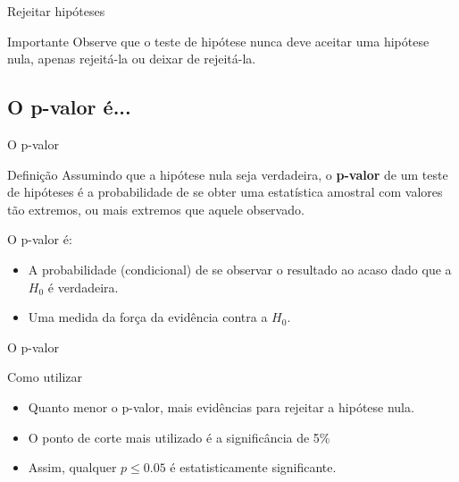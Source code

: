 \documentclass{beamer}
\begin{document}
\begin{frame}{\scriptsize Rejeitar hipóteses}
  \begin{block}{Importante}
    \footnotesize
    Observe que o teste de hipótese nunca deve \alert{aceitar} uma
    hipótese nula, apenas rejeitá-la ou deixar de rejeitá-la.
  \end{block}
\end{frame}

\subsection{O p-valor é...}

\begin{frame}{\scriptsize O p-valor}
  \begin{block}{Definição}
    \footnotesize
    Assumindo que a hipótese nula seja verdadeira, o {\bf p-valor} de
    um teste de hipóteses é a probabilidade de se obter uma
    estatística amostral com valores \alert{tão extremos, ou mais
      extremos} que aquele observado.
  \end{block}

  \bigskip
  \bigskip
  \scriptsize
  O p-valor \alert{é}:
  \smallskip
  \begin{itemize}
    \footnotesize
  \item A probabilidade (condicional) de se observar o resultado ao
    acaso \alert{dado que} a $H_0$ é verdadeira.
  \item Uma medida da força da evidência \alert{contra} a $H_0$.
  \end{itemize}
\end{frame}

\begin{frame}{\scriptsize O p-valor}
  \begin{block}{Como utilizar}
    \footnotesize
    \begin{itemize}
      \footnotesize
    \item Quanto menor o p-valor, mais evidências para rejeitar a
      hipótese nula.
    \item O ponto de corte mais utilizado é a significância de 5\%
    \item Assim, qualquer $p \le 0.05$ é estatisticamente significante.
    \end{itemize}
  \end{block}
\end{frame}
\end{document}
